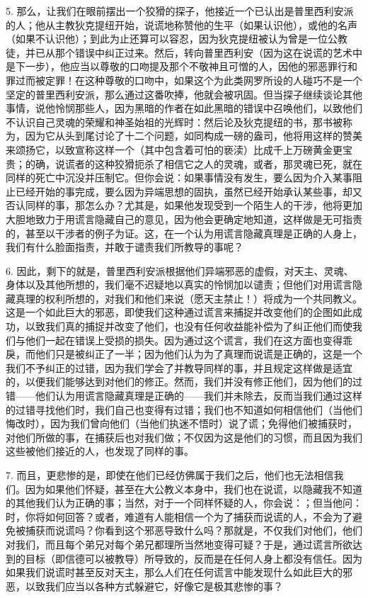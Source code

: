 5. 那么，让我们在眼前摆出一个狡猾的探子，他接近一个已认出是普里西利安派的人；他从主教狄克提纽开始，说谎地称赞他的生平（如果认识他），或他的名声（如果不认识他）；到此为止还算可以容忍，因为狄克提纽被认为曾是一位公教徒，并已从那个错误中纠正过来。然后，转向普里西利安（因为这在说谎的艺术中是下一步），他应当以尊敬的口吻提及那个不敬神且可憎的人，因他的邪恶罪行和罪过而被定罪！在这种尊敬的口吻中，如果这个为此类网罗所设的人碰巧不是一个坚定的普里西利安派，那么通过这番吹捧，他就会被巩固。但当探子继续谈论其他事情，说他怜悯那些人，因为黑暗的作者在如此黑暗的错误中召唤他们，以致他们不认识自己灵魂的荣耀和神圣始祖的光辉时：然后论及狄克提纽的书，那书被称为，因为它从头到尾讨论了十二个问题，如同构成一磅的盎司，他将用这样的赞美来颂扬它，以致宣称这样一个（其中包含着可怕的亵渎）比成千上万磅黄金更宝贵；的确，说谎者的这种狡猾扼杀了相信它之人的灵魂，或者，那灵魂已死，就在同样的死亡中沉没并压制它。但你会说：如果事情没有发生，要么因为介入某事阻止已经开始的事完成，要么因为异端思想的固执，虽然已经开始承认某些事，却又否认同样的事，那怎么办？尤其是，如果他发现受到一个陌生人的干涉，他将更加大胆地致力于用谎言隐藏自己的意见，因为他会更确定地知道，这样做是无可指责的，甚至以干涉者的例子为证。这，在一个认为用谎言隐藏真理是正确的人身上，我们有什么脸面指责，并敢于谴责我们所教导的事呢？\par

6. 因此，剩下的就是，普里西利安派根据他们异端邪恶的虚假，对天主、灵魂、身体以及其他所想的，我们毫不迟疑地以真实的怜悯加以谴责；但他们对用谎言隐藏真理的权利所想的，对我们和他们来说（愿天主禁止！）将成为一个共同教义。这是一个如此巨大的邪恶，即使我们这种通过谎言来捕捉并改变他们的企图如此成功，以致我们真的捕捉并改变了他们，也没有任何收益能补偿为了纠正他们而使我们与他们一起在错误上受损的损失。因为通过这个谎言，我们在这方面也变得乖戾，而他们只是被纠正了一半；因为他们认为为了真理而说谎是正确的，这是一个我们不予纠正的过错，因为我们学会了并教导同样的事，并且规定这样做是适宜的，以便我们能够达到对他们的修正。然而，我们并没有修正他们，因为他们的过错——他们认为用谎言隐藏真理是正确的——我们并未除去，反而当我们通过这样的过错寻找他们时，我们自己也变得有过错；我们也不知道如何相信他们（当他们悔改时），因为我们曾向他们（当他们执迷不悟时）说了谎；免得他们被捕获时，对他们所做的事，在捕获后也对我们做；不仅因为这是他们的习惯，而且因为我们这些被他们接近的人，也发现了同样的事。\par

7. 而且，更悲惨的是，即使在他们已经仿佛属于我们之后，他们也无法相信我们。因为如果他们怀疑，甚至在大公教义本身中，我们也在说谎，以隐藏我不知道的其他我们认为正确的事；当然，对于一个同样怀疑的人，你会说：；但当他问：时，你将如何回答？或者，难道有人能相信一个为了捕获而说谎的人，不会为了避免被捕获而说谎吗？你看到这个邪恶导致什么吗？那就是，不仅我们对他们，他们对我们，而且每个弟兄对每个弟兄都理所当然地变得可疑？于是，通过谎言所欲达到的目标（即信德可以被教导）所导致的，反而是在任何人身上都没有信任。因为如果我们说谎时甚至反对天主，那么人们在任何谎言中能发现什么如此巨大的邪恶，以致我们应当以各种方式躲避它，好像它是极其悲惨的事？\par

